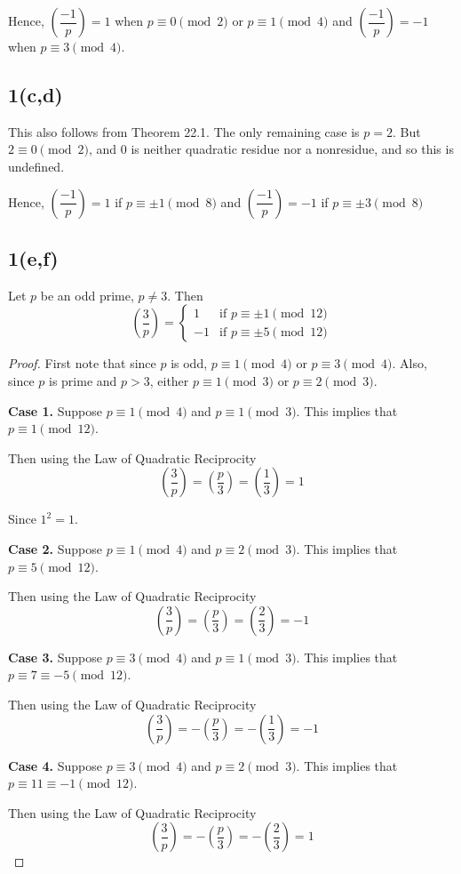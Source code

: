 Hence, $\left( \dfrac{-1}{p} \right)  = 1$ when $p \equiv 0 \pmod 2$ or 
$p \equiv 1 \pmod 4$ and 
$\left( \dfrac{-1}{p} \right)  = -1$ when $p \equiv 3 \pmod 4$.


\subsection{1(c,d)}
This also follows from Theorem 22.1. The only remaining case is $p=2$. But 
$2 \equiv 0 \pmod{2}$, and 0 is neither quadratic residue nor a nonresidue, and
so this is undefined.

Hence, $\left( \dfrac{-1}{p} \right)  = 1$ if $p \equiv \pm 1 \pmod{8}$
and $\left( \dfrac{-1}{p} \right)  = -1$ if $p \equiv \pm 3 \pmod{8}$

\subsection{1(e,f)}
\begin{lemma}
Let $p$ be an odd prime, $p \neq 3$. Then
\[
\left( \frac{3}{p} \right) =
\begin{cases}
	1  & \text{if } p \equiv \pm 1 \pmod{12} \\
	-1 & \text{if } p \equiv \pm 5 \pmod{12}
\end{cases}
\]
\end{lemma}
\begin{proof}
First note that since $p$ is odd, $p \equiv 1 \pmod 4$ or $p \equiv 3 \pmod 4$.
Also, since $p$ is prime and $p > 3$, either $p \equiv 1 \pmod 3$ or 
$p \equiv 2 \pmod 3$.

\textbf{Case 1.}
Suppose $p \equiv 1 \pmod 4$ and $p \equiv 1 \pmod 3$. This implies that
$p \equiv 1 \pmod{12}$.

Then using the Law of Quadratic Reciprocity
\[ 
\left( \frac{3}{p} \right) = 
\left( \frac{p}{3} \right) = 
\left( \frac{1}{3} \right) = 1 
\]

Since $1^2 = 1$.

\textbf{Case 2.}
Suppose $p \equiv 1 \pmod 4$ and $p \equiv 2 \pmod 3$. This implies that
$p \equiv 5 \pmod{12}$.

Then using the Law of Quadratic Reciprocity
\[ 
\left( \frac{3}{p} \right) = 
\left( \frac{p}{3} \right) = 
\left( \frac{2}{3} \right) = -1 
\]

\textbf{Case 3.}
Suppose $p \equiv 3 \pmod 4$ and $p \equiv 1 \pmod 3$. This implies that
$p \equiv 7 \equiv -5 \pmod{12}$.

Then using the Law of Quadratic Reciprocity
\[ 
\left( \frac{3}{p} \right) = 
- \left( \frac{p}{3} \right) = 
- \left( \frac{1}{3} \right) = -1 
\]

\textbf{Case 4.}
Suppose $p \equiv 3 \pmod 4$ and $p \equiv 2 \pmod 3$. This implies that
$p \equiv 11 \equiv -1 \pmod{12}$.

Then using the Law of Quadratic Reciprocity
\[ 
\left( \frac{3}{p} \right) = 
- \left( \frac{p}{3} \right) = 
- \left( \frac{2}{3} \right) = 1 
\]
\end{proof}

